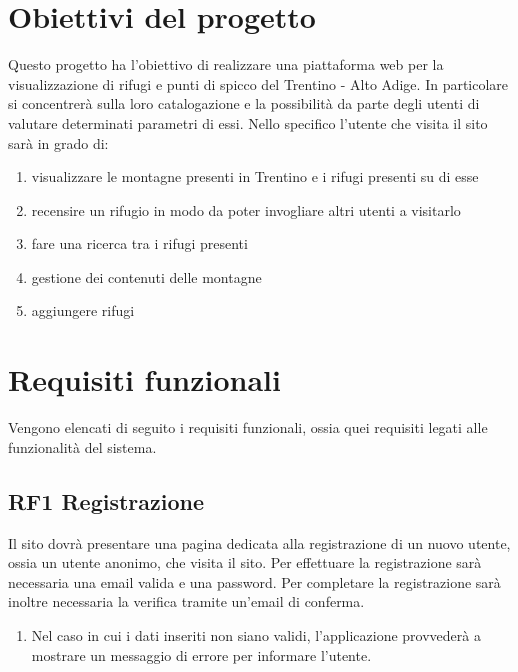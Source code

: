 \documentclass[a4paper,12pt]{article}
\begin{document}
\section{Obiettivi del progetto}

Questo progetto ha l’obiettivo di realizzare una piattaforma web per la visualizzazione di rifugi e punti di spicco del Trentino - Alto Adige. In particolare si concentrerà sulla loro catalogazione e la possibilità da parte degli utenti di valutare determinati parametri di essi. 
Nello specifico l'utente che visita il sito sarà in grado di:

\begin{enumerate}
    \item visualizzare le montagne presenti in Trentino e i rifugi presenti su di esse
    \item recensire un rifugio in modo da poter invogliare altri utenti a visitarlo
    \item fare una ricerca tra i rifugi presenti
    \item gestione dei contenuti delle montagne
    \item aggiungere rifugi

\end{enumerate}
    
\newpage

\section{Requisiti funzionali}

Vengono elencati di seguito i requisiti funzionali, ossia quei requisiti legati alle funzionalità del sistema.


\subsection*{RF1 Registrazione}
Il sito dovrà presentare una pagina dedicata alla registrazione di un nuovo utente, ossia un utente anonimo, che visita il sito. Per effettuare la registrazione sarà necessaria una email valida e una password. Per completare la registrazione sarà inoltre necessaria la verifica tramite un'email di conferma.
\begin{enumerate} [leftmargin=40pt]
    \item Nel caso in cui i dati inseriti non siano validi, l'applicazione provvederà a mostrare un messaggio di errore per informare l'utente. 
\end{enumerate}
\end{document}

